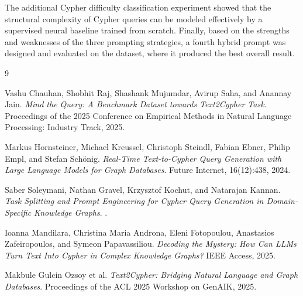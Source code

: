 \documentclass{article}
\begin{document}
The additional Cypher difficulty classification experiment showed that the structural complexity of Cypher queries can be modeled effectively by a supervised neural baseline trained from scratch. Finally, based on the strengths and weaknesses of the three prompting strategies, a fourth hybrid prompt was designed and evaluated on the dataset, where it produced the best overall result.

\begin{thebibliography}{9}

Vashu Chauhan, Shobhit Raj, Shashank Mujumdar, Avirup Saha, and Anannay Jain.
\newblock \emph{Mind the Query: A Benchmark Dataset towards Text2Cypher Task}.
\newblock Proceedings of the 2025 Conference on Empirical Methods in Natural Language Processing: Industry Track, 2025.

Markus Hornsteiner, Michael Kreussel, Christoph Steindl, Fabian Ebner, Philip Empl, and Stefan Sch{\"o}nig.
\newblock \emph{Real-Time Text-to-Cypher Query Generation with Large Language Models for Graph Databases}.
\newblock Future Internet, 16(12):438, 2024.

Saber Soleymani, Nathan Gravel, Krzysztof Kochut, and Natarajan Kannan.
\newblock \emph{Task Splitting and Prompt Engineering for Cypher Query Generation in Domain-Specific Knowledge Graphs}.
.

Ioanna Mandilara, Christina Maria Androna, Eleni Fotopoulou, Anastasios Zafeiropoulos, and Symeon Papavassiliou.
\newblock \emph{Decoding the Mystery: How Can LLMs Turn Text Into Cypher in Complex Knowledge Graphs?}
\newblock IEEE Access, 2025.

Makbule Gulcin Ozsoy et al.
\newblock \emph{Text2Cypher: Bridging Natural Language and Graph Databases}.
\newblock Proceedings of the ACL 2025 Workshop on GenAIK, 2025.

\end{thebibliography}
\end{document}
